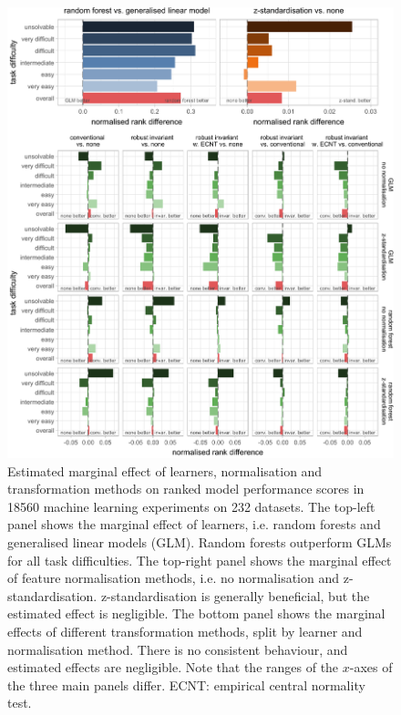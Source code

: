 \documentclass[preprint,12pt,authoryear]{elsarticle}
\begin{document}
\begin{figure}

{\centering \includegraphics[width=1\linewidth]{figure_10} 

}

\caption{Estimated marginal effect of learners, normalisation and transformation methods on ranked model performance scores in 18560 machine learning experiments on 232 datasets. The top-left panel shows the marginal effect of learners, i.e. random forests and generalised linear models (GLM). Random forests outperform GLMs for all task difficulties. The top-right panel shows the marginal effect of feature normalisation methods, i.e. no normalisation and z-standardisation. z-standardisation is generally beneficial, but the estimated effect is negligible. The bottom panel shows the marginal effects of different transformation methods, split by learner and normalisation method. There is no consistent behaviour, and estimated effects are negligible. Note that the ranges of the $x$-axes of the three main panels differ. ECNT: empirical central normality test.}\label{fig:marginal-effect-plot}
\end{figure}
\end{document}
